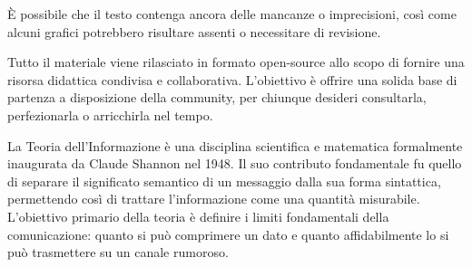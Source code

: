 \documentclass[a4paper,twoside,openany]{book}
\begin{document}
È possibile che il testo contenga ancora delle mancanze o imprecisioni, così come alcuni grafici potrebbero risultare assenti o necessitare di revisione.

Tutto il materiale viene rilasciato in formato open-source allo scopo di fornire una risorsa didattica condivisa e collaborativa. L'obiettivo è offrire una solida base di partenza a disposizione della community, per chiunque desideri consultarla, perfezionarla o arricchirla nel tempo.

\tableofcontents

\mainmatter

La Teoria dell'Informazione è una disciplina scientifica e matematica formalmente inaugurata da Claude Shannon nel 1948. Il suo contributo fondamentale fu quello di separare il significato semantico di un messaggio dalla sua forma sintattica, permettendo così di trattare l'informazione come una quantità misurabile. L'obiettivo primario della teoria è definire i limiti fondamentali della comunicazione: quanto si può comprimere un dato e quanto affidabilmente lo si può trasmettere su un canale rumoroso.












\end{document}
